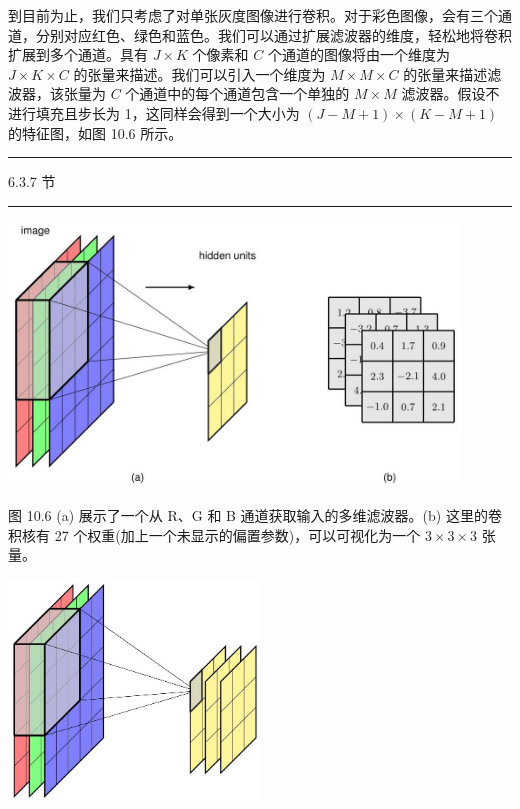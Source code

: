 \documentclass[10pt]{report}
\newcommand{\HRule}{\begin{center}\rule{0.9\linewidth}{0.2mm}\end{center}}
\begin{document}
到目前为止，我们只考虑了对单张灰度图像进行卷积。对于彩色图像，会有三个通道，分别对应红色、绿色和蓝色。我们可以通过扩展滤波器的维度，轻松地将卷积扩展到多个通道。具有 \(J \times  K\) 个像素和 \(C\) 个通道的图像将由一个维度为 \(J \times  K \times  C\) 的张量来描述。我们可以引入一个维度为 \(M \times  M \times  C\) 的张量来描述滤波器，该张量为 \(C\) 个通道中的每个通道包含一个单独的 \(M \times  M\) 滤波器。假设不进行填充且步长为 1，这同样会得到一个大小为 \(\left( {J - M + 1}\right)  \times  \left( {K - M + 1}\right)\) 的特征图，如图 10.6 所示。

\HRule

6.3.7 节

\HRule

\begin{center}
\includegraphics[max width=0.9\textwidth]{images/0194e279-9b28-703a-88f4-c3ac21e2010d_314_236_1176_1170_688_0.jpg}
\end{center}
\hspace*{3em} 

图 10.6 (a) 展示了一个从 R、G 和 B 通道获取输入的多维滤波器。(b) 这里的卷积核有 27 个权重(加上一个未显示的偏置参数)，可以可视化为一个 \(3 \times  3 \times  3\) 张量。

\begin{center}
\includegraphics[max width=0.5\textwidth]{images/0194e279-9b28-703a-88f4-c3ac21e2010d_315_847_341_709_625_0.jpg}
\end{center}
\hspace*{3em} 
\end{document}
